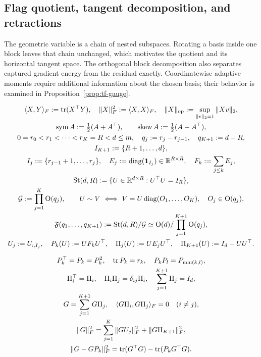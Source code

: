 \subsection{Flag quotient, tangent decomposition, and retractions}
The geometric variable is a chain of nested subspaces. Rotating a basis inside
one block leaves that chain unchanged, which motivates the quotient and its
horizontal tangent space. The orthogonal block decomposition also separates
captured gradient energy from the residual exactly. Coordinatewise adaptive
moments require additional information about the chosen basis; their behavior
is examined in Proposition~\ref{prop:tf-gauge}.

\begin{definition}
\begin{gather}
 \langle X,Y\rangle_F:=\tr(X^\top Y),\quad
 \|X\|_F^2:=\langle X,X\rangle_F,\quad
 \|X\|_{\op}:=\sup_{\|v\|_2=1}\|Xv\|_2,\\
 \sym A:=\tfrac12(A+A^\top),\qquad
 \skw A:=\tfrac12(A-A^\top),\\
 0=r_0<r_1<\cdots<r_K=R<d\le m,\quad
 q_j:=r_j-r_{j-1},\quad q_{K+1}:=d-R,\\
 I_{K+1}:=\{R+1,\ldots,d\},\\
 I_j:=\{r_{j-1}+1,\ldots,r_j\},\quad
 E_j:=\diag(\mathbf1_{I_j})\in\RR^{R\times R},\quad
 F_k:=\sum_{j\le k}E_j,\\
 \St(d,R):=\{U\in\RR^{d\times R}:U^\top U=I_R\},\\
 \mathcal G:=\prod_{j=1}^K\mathrm O(q_j),\qquad
 U\sim V\ \Longleftrightarrow\ 
 V=U\diag(O_1,\ldots,O_K),\quad O_j\in\mathrm O(q_j),\\
 \mathfrak F(q_1,\ldots,q_{K+1})
 :=\St(d,R)/\mathcal G
 \simeq\mathrm O(d)/\prod_{j=1}^{K+1}\mathrm O(q_j),\\
 U_j:=U_{:,I_j},\quad
 P_k(U):=UF_kU^\top,\quad
 \Pi_j(U):=UE_jU^\top,\quad \Pi_{K+1}(U):=I_d-UU^\top.
 \label{eq:tf-projectors}
\end{gather}
\end{definition}
\begin{proposition}\label{lem:tf-energy}
\begin{gather}
 P_k^\top=P_k=P_k^2,\quad \operatorname{tr} P_k=r_k,\quad
 P_kP_l=P_{\min(k,l)},\\
 \Pi_i^\top=\Pi_i,\quad \Pi_i\Pi_j=\delta_{ij}\Pi_i,
 \quad\sum_{j=1}^{K+1}\Pi_j=I_d,\\
 G=\sum_{j=1}^{K+1}G\Pi_j,\quad
 \langle G\Pi_i,G\Pi_j\rangle_F=0\quad(i\ne j),\\
 \|G\|_F^2=\sum_{j=1}^K\|GU_j\|_F^2+
 \|G\Pi_{K+1}\|_F^2,\\
 \|G-GP_k\|_F^2=\operatorname{tr}(G^\top G)-\operatorname{tr}(P_kG^\top G).
\end{gather}
\end{proposition}
